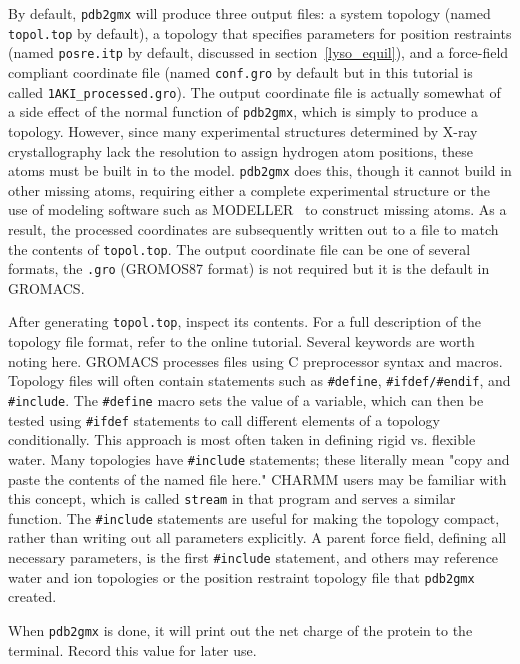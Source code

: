 \documentclass[9pt,tutorial,pubversion]{livecoms}
\begin{document}
By default, \texttt{pdb2gmx} will produce three output files: a system topology (named \texttt{topol.top} by default), a topology that specifies parameters for position restraints (named \texttt{posre.itp} by default, discussed in section~\ref{lyso_equil}), and a force-field compliant coordinate file (named \texttt{conf.gro} by default but in this tutorial is called \texttt{1AKI\_processed.gro}). The output coordinate file is actually somewhat of a side effect of the normal function of \texttt{pdb2gmx}, which is simply to produce a topology. However, since many experimental structures determined by X-ray crystallography lack the resolution to assign hydrogen atom positions, these atoms must be built in to the model. \texttt{pdb2gmx} does this, though it cannot build in other missing atoms, requiring either a complete experimental structure or the use of modeling software such as MODELLER~\cite{Sali1993} to construct missing atoms. As a result, the processed coordinates are subsequently written out to a file to match the contents of \texttt{topol.top}. The output coordinate file can be one of several formats, the \texttt{.gro} (GROMOS87 format) is not required but it is the default in GROMACS.

After generating \texttt{topol.top}, inspect its contents. For a full description of the topology file format, refer to the online tutorial. Several keywords are worth noting here. GROMACS processes files using C preprocessor syntax and macros. Topology files will often contain statements such as \texttt{\#define}, \texttt{\#ifdef/\#endif}, and \texttt{\#include}. The \texttt{\#define} macro sets the value of a variable, which can then be tested using \texttt{\#ifdef} statements to call different elements of a topology conditionally. This approach is most often taken in defining rigid vs. flexible water. Many topologies have \texttt{\#include} statements; these literally mean "copy and paste the contents of the named file here." CHARMM users may be familiar with this concept, which is called \texttt{stream} in that program and serves a similar function. The \texttt{\#include} statements are useful for making the topology compact, rather than writing out all parameters explicitly. A parent force field, defining all necessary parameters, is the first \texttt{\#include} statement, and others may reference water and ion topologies or the position restraint topology file that \texttt{pdb2gmx} created.

When \texttt{pdb2gmx} is done, it will print out the net charge of the protein to the terminal. Record this value for later use.
\end{document}
